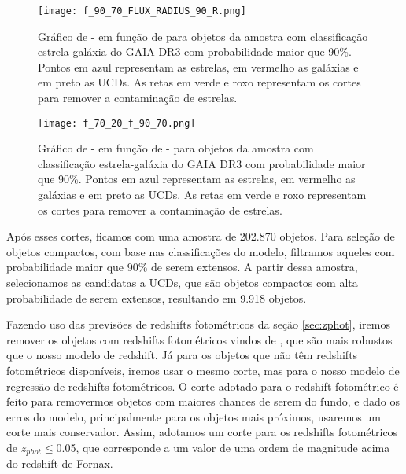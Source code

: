 \begin{figure}[!ht]
    \begin{center}
    \texttt{[image: f\_90\_70\_FLUX\_RADIUS\_90\_R.png]}
    \caption[]{Gráfico de  -  em função de  para objetos da amostra com classificação estrela-galáxia do GAIA DR3 com probabilidade maior que 90\%. Pontos em azul representam as estrelas, em vermelho as galáxias e em preto as UCDs. As retas em verde e roxo representam os cortes para remover a contaminação de estrelas.}
    \label{flux_radius_2}
    \end{center}
\end{figure}

\begin{figure}[!ht]
    \begin{center}
    \texttt{[image: f\_70\_20\_f\_90\_70.png]}
    \caption[]{Gráfico de  -  em função de  -  para objetos da amostra com classificação estrela-galáxia do GAIA DR3 com probabilidade maior que 90\%. Pontos em azul representam as estrelas, em vermelho as galáxias e em preto as UCDs. As retas em verde e roxo representam os cortes para remover a contaminação de estrelas.}
    \label{flux_radius_3}
    \end{center}
\end{figure}

Após esses cortes, ficamos com uma amostra de 202.870 objetos. Para seleção de objetos compactos, com base nas classificações do modelo, filtramos aqueles com probabilidade maior que 90\% de serem extensos. A partir dessa amostra, selecionamos as candidatas a UCDs, que são objetos compactos com alta probabilidade de serem extensos, resultando em 9.918 objetos.

Fazendo uso das previsões de redshifts fotométricos da seção \ref{sec:zphot}, iremos remover os objetos com redshifts fotométricos vindos de \citep{erik_photoz_2024}, que são mais robustos que o nosso modelo de redshift. Já para os objetos que não têm redshifts fotométricos disponíveis, iremos usar o mesmo corte, mas para o nosso modelo de regressão de redshifts fotométricos. O corte adotado para o redshift fotométrico é feito para removermos objetos com maiores chances de serem do fundo, e dado os erros do modelo, principalmente para os objetos mais próximos, usaremos um corte mais conservador. Assim, adotamos um corte para os redshifts fotométricos de \textit{$z_{phot}$}$\leq$0.05, que corresponde a um valor de uma ordem de magnitude acima do redshift de Fornax.

